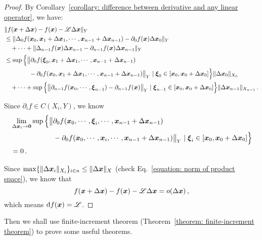 \documentclass[openany]{book}
\begin{document}
\begin{proof}
	By Corollary~\ref{corollary: difference between derivative and any linear operator}, we have:
	\begin{align*}
		&\|f(\boldsymbol{x} + \Delta \boldsymbol{x}) - f(\boldsymbol{x}) - \mathscr L \Delta \boldsymbol{x}\|_Y 
		\\
		&\leq \|\Delta_0 f(\boldsymbol{x}_0, \boldsymbol{x}_1 + \Delta \boldsymbol{x}_1, \cdots, \boldsymbol{x}_{n-1} + \Delta \boldsymbol{x}_{n-1}) - \partial_0 f(\boldsymbol{x})\Delta \boldsymbol{x}_0\|_Y
		\\
		&\quad + \cdots 
		 + \|\Delta_{n-1} f(\boldsymbol{x}) \Delta \boldsymbol{x}_{n-1} - \partial_{n-1} f(\boldsymbol{x}) \Delta \boldsymbol{x}_{n-1}\|_Y
		\\
		&\leq \sup\Big\{\big\|\partial_0 f(\boldsymbol{\xi}_0, \boldsymbol{x}_1 + \Delta \boldsymbol{x}_1, \cdots, \boldsymbol{x}_{n-1} + \Delta \boldsymbol{x}_{n-1}) 
		\\
			&\qquad\qquad - \partial_0 f(\boldsymbol{x}_0, \boldsymbol{x}_1 + \Delta \boldsymbol{x}_1, \cdots, \boldsymbol{x}_{n-1} + \Delta \boldsymbol{x}_{n-1})\big\|_Y
		\mid \boldsymbol{\xi}_0 \in [\boldsymbol{x}_0, \boldsymbol{x}_0 + \Delta \boldsymbol{x}_0]\Big\} 
			\|\Delta \boldsymbol{x}_0\|_{X_0}
		\\
		&\quad + \cdots 
		 + \sup\Big\{\big\|\partial_{n-1} f(\boldsymbol{x}_0, \cdots, \boldsymbol{\xi}_{n-1}) - \partial_{n-1} f(\boldsymbol{x})\big\|_Y
		 \mid \boldsymbol{\xi}_{n-1} \in [\boldsymbol{x}_0, \boldsymbol{x}_0 + \Delta \boldsymbol{x}_0]\Big\} 
			 \|\Delta \boldsymbol{x}_{n-1}\|_{X_{n-1}} \,.
	\end{align*}

	Since $\partial_i f \in C(X_i, Y)$, we know
	\begin{align*}
		&\lim_{\Delta \boldsymbol{x}_i \to \boldsymbol{0}}\sup\Big\{\big\|\partial_0 f(\boldsymbol{x}_0, \cdots, \boldsymbol{\xi}_i, \cdots, \boldsymbol{x}_{n-1} + \Delta \boldsymbol{x}_{n-1}) 
		\\
			&\qquad\qquad\qquad - \partial_0 f(\boldsymbol{x}_0, \cdots, \boldsymbol{x}_i, \cdots, \boldsymbol{x}_{n-1} + \Delta \boldsymbol{x}_{n-1})\big\|_Y
		\mid \boldsymbol{\xi}_i \in [\boldsymbol{x}_0, \boldsymbol{x}_0 + \Delta \boldsymbol{x}_0]\Big\} 
		\\
		&= 0\,.
	\end{align*}

	Since $\max\{\|\Delta \boldsymbol{x}_i\|_{X_{i}}\}_{i \in n} \leq \|\Delta \boldsymbol{x}\|_X$ (check Eq.~\eqref{equation: norm of product space}), we know that
	\begin{equation*}
		f(\boldsymbol{x} + \Delta \boldsymbol{x}) - f(\boldsymbol{x}) - \mathscr L \Delta \boldsymbol{x}
		= o(\Delta \boldsymbol{x})\,,
	\end{equation*}
	which means $\mathrm{d} f(\boldsymbol{x}) = \mathscr L$.
\end{proof}

Then we shall use finite-increment theorem (Theorem~\ref{theorem: finite-increment theorem}) to prove some useful theorems.
\end{document}
